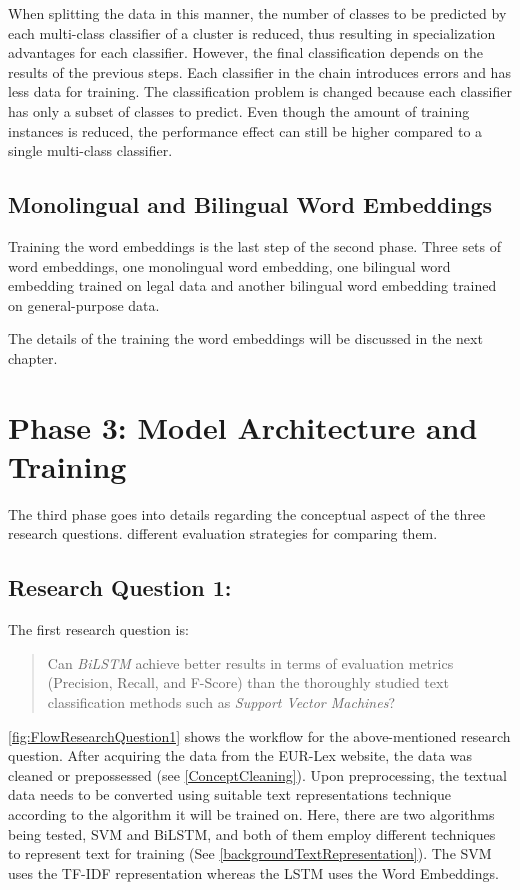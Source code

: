 When splitting the data in this manner, the number of classes to be predicted by each multi-class classifier of a cluster is reduced, thus resulting in specialization advantages for each classifier. However, the final classification depends on the results of the previous steps. Each classifier in the chain introduces errors and has less data for training. The classification problem is changed because each classifier has only a subset of classes to predict. Even though the amount of training instances is reduced, the performance effect can still be higher compared to a single multi-class classifier.



\subsection*{Monolingual and Bilingual Word Embeddings}
Training the word embeddings is the last step of the second phase. Three sets of word embeddings, one monolingual word embedding, one bilingual word embedding trained on legal data and another bilingual word embedding trained on general-purpose data.   

The details of the training the word embeddings will be discussed in the next chapter.

\section{Phase 3: Model Architecture and Training}\label{sec:conceptRQ}
The third phase goes into details regarding the conceptual aspect of the three research questions. different evaluation strategies for comparing them. 


\subsection{Research Question 1:} \label{question1}
The first research question is:
\begin{quote}
    Can \textit{\gls{BiLSTM}} achieve better results in terms of evaluation metrics (Precision, Recall, and F-Score) than the thoroughly studied text classification methods such as \textit{Support Vector Machines}?
\end{quote}

\ref{fig:FlowResearchQuestion1} shows the workflow for the above-mentioned research question. After acquiring the data from the EUR-Lex website, the data was cleaned or prepossessed (see \ref{ConceptCleaning}). Upon preprocessing, the textual data needs to be converted using suitable text representations technique according to the algorithm it will be trained on. Here, there are two algorithms being tested, \gls{SVM} and \gls{BiLSTM}, and both of them employ different techniques to represent text for training (See \ref{backgroundTextRepresentation}). The \gls{SVM} uses the \gls{TF-IDF} representation whereas the LSTM uses the Word Embeddings. 
 
